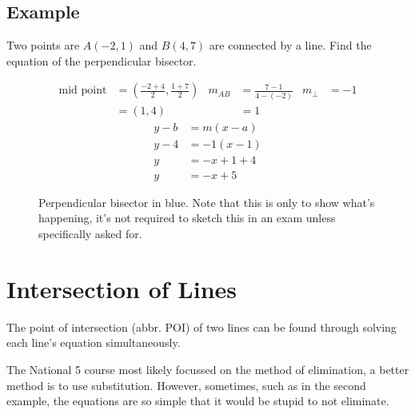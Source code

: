 \subsection{Example}
Two points are $A(-2,1)$ and $B(4,7)$ are connected by a line. Find the equation of the perpendicular bisector.

\begin{align*}
	\text{mid point} &= \left(\frac{-2+4}{2},\frac{1+7}{2}\right) & m_{AB} &= \frac{7-1}{4-(-2)} & m_\perp&=-1\\
	&=(1,4) & &=1
\end{align*}
\begin{align*}
	y-b&=m(x-a)\\
	y-4&=-1(x-1)\\
	y&=-x+1+4\\
	y&=-x+5
\end{align*}

\begin{figure}[h!]
	\centering
	\caption{Perpendicular bisector in blue. Note that this is only to show what's happening, it's not required to sketch this in an exam unless specifically asked for.}
	\label{fig:PBexample}
\end{figure}


\section{Intersection of Lines}
The point of intersection (abbr. POI) of two lines can be found through solving each line's equation simultaneously.

The National 5 course most likely focussed on the method of elimination, a better method is to use substitution. However, sometimes, such as in the second example, the equations are so simple that it would be stupid to not eliminate.

